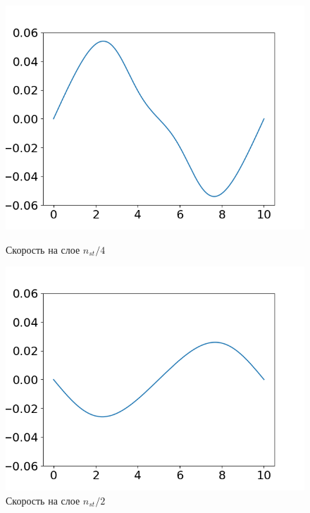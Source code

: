 \begin{figure}[h]
	\begin{minipage}[h]{0.47\linewidth}
		\centering
		\includegraphics[width=1\linewidth]{pics/task2/14u_1.png} 
		\caption{Скорость на слое $n_{st} / 4$}
	\end{minipage}
	\hfill
	\begin{minipage}[h]{0.47\linewidth}
		\centering
		\includegraphics[width=1\linewidth]{pics/task2/24u_1.png} 
		\caption{Скорость на слое $n_{st} / 2$}
	\end{minipage}
	\vfill
	\begin{minipage}[h]{0.47\linewidth}
		\centering

\end{minipage}
\end{figure}
